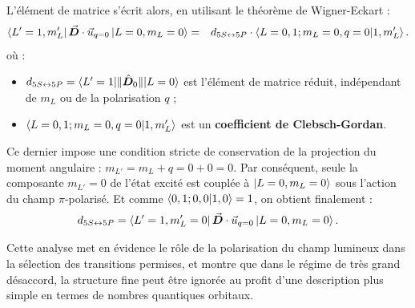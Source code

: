 L’élément de matrice s’écrit alors, en utilisant le théorème de Wigner-Eckart :
\begin{eqnarray}
\bra{L' = 1, m_L'} \vec{{\bm{D}}} \cdot \vec{u}_{q=0} \ket{L = 0, m_L = 0}
& = & d_{\scriptstyle 5S \leftrightarrow 5P} \cdot \braket{L=0, 1; m_L = 0, q=0 | 1, m_L' }.
\end{eqnarray}
où :
\begin{itemize}
	\item $d_{\scriptstyle 5S \leftrightarrow 5P} = \braket{L' = 1 \vert \Vert \hat{\bm{D}}_0 \Vert \vert L =0 }$  est l’élément de matrice réduit,  indépendant de $m_L$ ou de la polarisation $q$ ;
	\item $\braket{L=0, 1; m_L = 0, q=0 | 1, m_L' }$ est un \textbf{coefficient de Clebsch-Gordan}.
\end{itemize}
Ce dernier impose une condition stricte de conservation de la projection du moment angulaire : $m_{L'} = m_L + q = 0 + 0  = 0 $. Par conséquent, seule la composante $m_{L'} = 0 $  de l’état excité est couplée à $\ket{L = 0 , m_L = 0}$ sous l’action du champ $\pi$-polarisé. Et comme $\braket{0,1;0,0|1,0}=1$, on obtient finalement :
%
\begin{eqnarray}
 d_{\scriptstyle 5S \leftrightarrow 5P} = \bra{L' = 1, m_L'=0} \vec{{\bm{D}}} \cdot \vec{u}_{q=0} \ket{L = 0, m_L = 0} .
\end{eqnarray}

Cette analyse met en évidence le rôle de la polarisation du champ lumineux dans la sélection des transitions permises, et montre que dans le régime de très grand désaccord, la structure fine peut être ignorée au profit d’une description plus simple en termes de nombres quantiques orbitaux.


